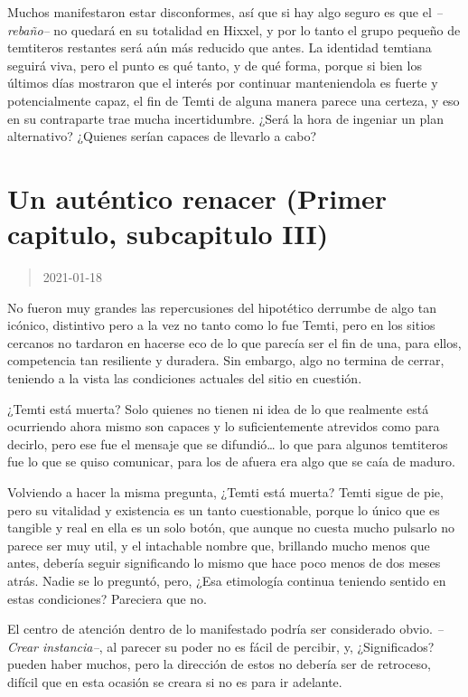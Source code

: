 \documentclass[
  spanish,
]{book}
\begin{document}
Muchos manifestaron estar disconformes, así que si hay algo seguro es que el \emph{--rebaño--} no quedará en su totalidad en Hixxel, y por lo tanto el grupo pequeño de temtiteros restantes será aún más reducido que antes.
La identidad temtiana seguirá viva, pero el punto es qué tanto, y de qué forma, porque si bien los últimos días mostraron que el interés por continuar manteniendola es fuerte y potencialmente capaz, el fin de Temti de alguna manera parece una certeza, y eso en su contraparte trae mucha incertidumbre. ¿Será la hora de ingeniar un plan alternativo? ¿Quienes serían capaces de llevarlo a cabo?

\hypertarget{un-autuxe9ntico-renacer-primer-capitulo-subcapitulo-iii}{%
\section{Un auténtico renacer (Primer capitulo, subcapitulo III)}\label{un-autuxe9ntico-renacer-primer-capitulo-subcapitulo-iii}}

\begin{quote}
2021-01-18
\end{quote}

No fueron muy grandes las repercusiones del hipotético derrumbe de algo tan icónico, distintivo pero a la vez no tanto como lo fue Temti, pero en los sitios cercanos no tardaron en hacerse eco de lo que parecía ser el fin de una, para ellos, competencia tan resiliente y duradera. Sin embargo, algo no termina de cerrar, teniendo a la vista las condiciones actuales del sitio en cuestión.

¿Temti está muerta? Solo quienes no tienen ni idea de lo que realmente está ocurriendo ahora mismo son capaces y lo suficientemente atrevidos como para decirlo, pero ese fue el mensaje que se difundió\ldots{} lo que para algunos temtiteros fue lo que se quiso comunicar, para los de afuera era algo que se caía de maduro.

Volviendo a hacer la misma pregunta, ¿Temti está muerta? Temti sigue de pie, pero su vitalidad y existencia es un tanto cuestionable, porque lo único que es tangible y real en ella es un solo botón, que aunque no cuesta mucho pulsarlo no parece ser muy util, y el intachable nombre que, brillando mucho menos que antes, debería seguir significando lo mismo que hace poco menos de dos meses atrás. Nadie se lo preguntó, pero, ¿Esa etimología continua teniendo sentido en estas condiciones? Pareciera que no.

El centro de atención dentro de lo manifestado podría ser considerado obvio. \emph{--Crear instancia--}, al parecer su poder no es fácil de percibir, y, ¿Significados? pueden haber muchos, pero la dirección de estos no debería ser de retroceso, difícil que en esta ocasión se creara si no es para ir adelante.
\end{document}
